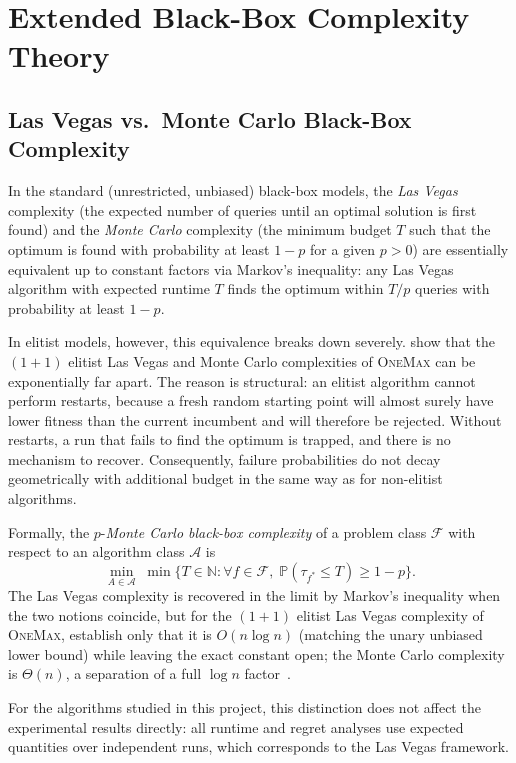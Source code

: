 \chapter{Extended Black-Box Complexity Theory}
\label{app:bbc-extended}

\section{Las Vegas vs.\ Monte Carlo Black-Box Complexity}
\label{app:lv-mc}

In the standard (unrestricted, unbiased) black-box models, the
\textit{Las Vegas} complexity (the expected number of queries until
an optimal solution is first found)  and the \textit{Monte Carlo}
complexity (the minimum budget $T$ such that the optimum is found
with probability at least $1 - p$ for a given $p > 0$)  are
essentially equivalent up to constant factors via Markov's inequality:
any Las Vegas algorithm with expected runtime $T$ finds the optimum
within $T/p$ queries with probability at least $1 - p$.

In elitist models, however, this equivalence breaks down severely.
\citet{doerr2015onemax} show that the $(1+1)$ elitist Las Vegas and
Monte Carlo complexities of \textsc{OneMax} can be exponentially far
apart. The reason is structural: an elitist algorithm cannot perform
restarts, because a fresh random starting point will almost surely
have lower fitness than the current incumbent and will therefore be
rejected. Without restarts, a run that fails to find the optimum is
trapped, and there is no mechanism to recover. Consequently, failure
probabilities do not decay geometrically with additional budget in the
same way as for non-elitist algorithms.

Formally, the $p$-\textit{Monte Carlo black-box complexity} of a
problem class $\mathcal{F}$ with respect to an algorithm class
$\mathcal{A}$ is
\[
  \min_{A \in \mathcal{A}}\;
  \min\bigl\{T \in \mathbb{N} :
    \forall f \in \mathcal{F},\;
  \mathbb{P}(\tau_{f^*} \leq T) \geq 1 - p\bigr\}.
\]
The Las Vegas complexity is recovered in the limit by Markov's
inequality when the two notions coincide, but for the $(1+1)$ elitist
Las Vegas complexity of \textsc{OneMax}, \citeauthor{doerr2015onemax}
establish only that it is $O(n \log n)$ (matching the unary unbiased
lower bound) while leaving the exact constant open; the Monte Carlo
complexity is $\Theta(n)$, a separation of a full $\log n$
factor~\cite{doerr2015onemax}.

For the algorithms studied in this project, this distinction does not
affect the experimental results directly: all runtime and regret
analyses use expected quantities over independent runs, which
corresponds to the Las Vegas framework.


